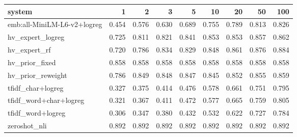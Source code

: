 \begin{tabular}{lrrrrrrrr}
\toprule
system & 1 & 2 & 3 & 5 & 10 & 20 & 50 & 100 \\
\midrule
emb:all-MiniLM-L6-v2+logreg & 0.454 & 0.576 & 0.630 & 0.689 & 0.755 & 0.789 & 0.813 & 0.826 \\
hv\_expert\_logreg & 0.725 & 0.811 & 0.821 & 0.841 & 0.853 & 0.853 & 0.857 & 0.862 \\
hv\_expert\_rf & 0.720 & 0.786 & 0.834 & 0.829 & 0.848 & 0.861 & 0.876 & 0.884 \\
hv\_prior\_fixed & 0.858 & 0.858 & 0.858 & 0.858 & 0.858 & 0.858 & 0.858 & 0.858 \\
hv\_prior\_reweight & 0.786 & 0.849 & 0.848 & 0.847 & 0.845 & 0.852 & 0.855 & 0.859 \\
tfidf\_char+logreg & 0.327 & 0.375 & 0.414 & 0.476 & 0.578 & 0.661 & 0.751 & 0.795 \\
tfidf\_word+char+logreg & 0.321 & 0.367 & 0.411 & 0.472 & 0.577 & 0.665 & 0.759 & 0.805 \\
tfidf\_word+logreg & 0.306 & 0.347 & 0.380 & 0.432 & 0.532 & 0.622 & 0.727 & 0.784 \\
zeroshot\_nli & 0.892 & 0.892 & 0.892 & 0.892 & 0.892 & 0.892 & 0.892 & 0.892 \\
\bottomrule
\end{tabular}
